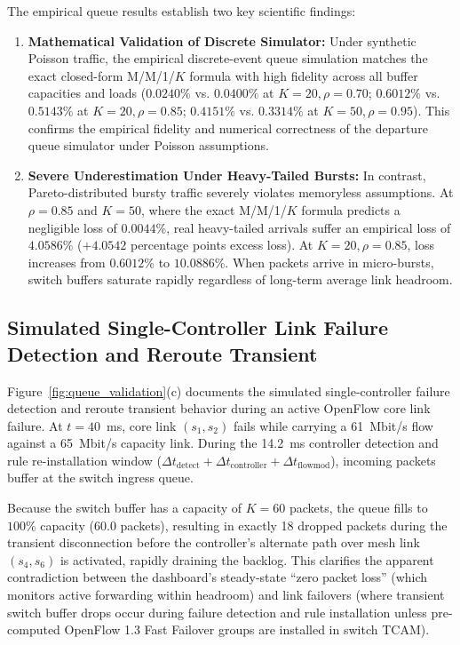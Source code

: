 \documentclass[12pt,a4paper,oneside]{report}
\begin{document}
The empirical queue results establish two key scientific findings:
\begin{enumerate}
  \item \textbf{Mathematical Validation of Discrete Simulator:} Under synthetic Poisson traffic, the empirical discrete-event queue simulation matches the exact closed-form M/M/1/$K$ formula with high fidelity across all buffer capacities and loads ($0.0240\%$ vs. $0.0400\%$ at $K=20, \rho=0.70$; $0.6012\%$ vs. $0.5143\%$ at $K=20, \rho=0.85$; $0.4151\%$ vs. $0.3314\%$ at $K=50, \rho=0.95$). This confirms the empirical fidelity and numerical correctness of the departure queue simulator under Poisson assumptions.
  \item \textbf{Severe Underestimation Under Heavy-Tailed Bursts:} In contrast, Pareto-distributed bursty traffic severely violates memoryless assumptions. At $\rho=0.85$ and $K=50$, where the exact M/M/1/$K$ formula predicts a negligible loss of $0.0044\%$, real heavy-tailed arrivals suffer an empirical loss of $4.0586\%$ ($+4.0542$ percentage points excess loss). At $K=20, \rho=0.85$, loss increases from $0.6012\%$ to $10.0886\%$. When packets arrive in micro-bursts, switch buffers saturate rapidly regardless of long-term average link headroom.
\end{enumerate}

\subsection{Simulated Single-Controller Link Failure Detection and Reroute Transient}
Figure~\ref{fig:queue_validation}(c) documents the simulated single-controller failure detection and reroute transient behavior during an active OpenFlow core link failure. At $t=40$~ms, core link $(s_1, s_2)$ fails while carrying a 61~Mbit/s flow against a 65~Mbit/s capacity link. During the 14.2~ms controller detection and rule re-installation window ($\Delta t_{\mathrm{detect}} + \Delta t_{\mathrm{controller}} + \Delta t_{\mathrm{flowmod}}$), incoming packets buffer at the switch ingress queue.

Because the switch buffer has a capacity of $K=60$ packets, the queue fills to $100\%$ capacity ($60.0$ packets), resulting in exactly 18 dropped packets during the transient disconnection before the controller's alternate path over mesh link $(s_4, s_6)$ is activated, rapidly draining the backlog. This clarifies the apparent contradiction between the dashboard's steady-state ``zero packet loss'' (which monitors active forwarding within headroom) and link failovers (where transient switch buffer drops occur during failure detection and rule installation unless pre-computed OpenFlow 1.3 Fast Failover groups are installed in switch TCAM).
\end{document}
